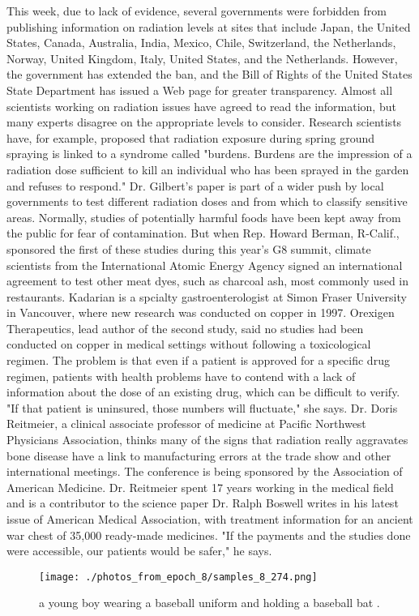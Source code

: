 \documentclass{article}%
\begin{document}
This week, due to lack of evidence, several governments were forbidden from publishing information on radiation levels at sites that include Japan, the United States, Canada, Australia, India, Mexico, Chile, Switzerland, the Netherlands, Norway, United Kingdom, Italy, United States, and the Netherlands. However, the government has extended the ban, and the Bill of Rights of the United States State Department has issued a Web page for greater transparency.\newline%
Almost all scientists working on radiation issues have agreed to read the information, but many experts disagree on the appropriate levels to consider. Research scientists have, for example, proposed that radiation exposure during spring ground spraying is linked to a syndrome called "burdens. Burdens are the impression of a radiation dose sufficient to kill an individual who has been sprayed in the garden and refuses to respond."\newline%
Dr. Gilbert's paper is part of a wider push by local governments to test different radiation doses and from which to classify sensitive areas. Normally, studies of potentially harmful foods have been kept away from the public for fear of contamination. But when Rep. Howard Berman, R{-}Calif., sponsored the first of these studies during this year's G8 summit, climate scientists from the International Atomic Energy Agency signed an international agreement to test other meat dyes, such as charcoal ash, most commonly used in restaurants.\newline%
Kadarian is a spcialty gastroenterologist at Simon Fraser University in Vancouver, where new research was conducted on copper in 1997. Orexigen Therapeutics, lead author of the second study, said no studies had been conducted on copper in medical settings without following a toxicological regimen. The problem is that even if a patient is approved for a specific drug regimen, patients with health problems have to contend with a lack of information about the dose of an existing drug, which can be difficult to verify.\newline%
"If that patient is uninsured, those numbers will fluctuate," she says.\newline%
Dr. Doris Reitmeier, a clinical associate professor of medicine at Pacific Northwest Physicians Association, thinks many of the signs that radiation really aggravates bone disease have a link to manufacturing errors at the trade show and other international meetings. The conference is being sponsored by the Association of American Medicine. Dr. Reitmeier spent 17 years working in the medical field and is a contributor to the science paper Dr. Ralph Boswell writes in his latest issue of American Medical Association, with treatment information for an ancient war chest of 35,000 ready{-}made medicines. "If the payments and the studies done were accessible, our patients would be safer," he says.\newline%

%


\begin{figure}[h!]%
\centering%
\texttt{[image: ./photos\_from\_epoch\_8/samples\_8\_274.png]}%
\caption{a young boy wearing a baseball uniform and holding a baseball bat .}%
\end{figure}

%
\end{document}
